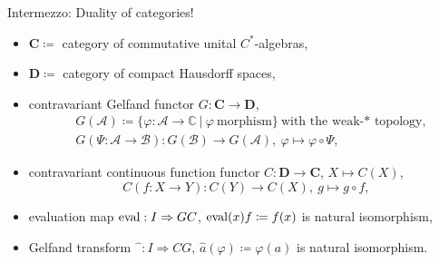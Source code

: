 \begin{frame}{Intermezzo: Duality of categories!}
  \begin{itemize}
    \item $\mathbf{C}\coloneq$ category of commutative unital $C^*$-algebras,
    \item $\mathbf{D} \coloneq$ category of compact Hausdorff spaces,
          \item \pause
contravariant Gelfand functor $G: \mathbf{C} \to \mathbf{D}$,
      \begin{equation*}
        \begin{split}
          & G(\mathscr{A}) \coloneq \{ \varphi : \mathscr{A} \to \mathbb{C} \ | \ \varphi \ \text{morphism}\} \ \text{with the weak-* topology}, \\
          & G( \Psi : \mathscr{A} \to \mathscr{B}) : G(\mathscr{B} ) \to G(\mathscr{A}), \ \varphi \mapsto \varphi \circ \Psi,
        \end{split}
    \end{equation*}
  \item \pause contravariant continuous function functor $C: \mathbf{D} \to \mathbf{C}$, $X \mapsto C(X)$, 
    \begin{equation*}
       C(f:X \to Y) : C(Y) \to C(X), \ g \mapsto g \circ f,
    \end{equation*}
  \item \pause  evaluation map $\operatorname{eval} : I \Rightarrow GC$, $\operatorname{eval} (x) f\coloneq f(x)$ is natural isomorphism,
  \item Gelfand transform $\widehat{\phantom{a}} : I \Rightarrow CG$, $\widehat{a}(\varphi)\coloneq\varphi (a)$ is natural isomorphism.
      \end{itemize}
      \end{frame}
